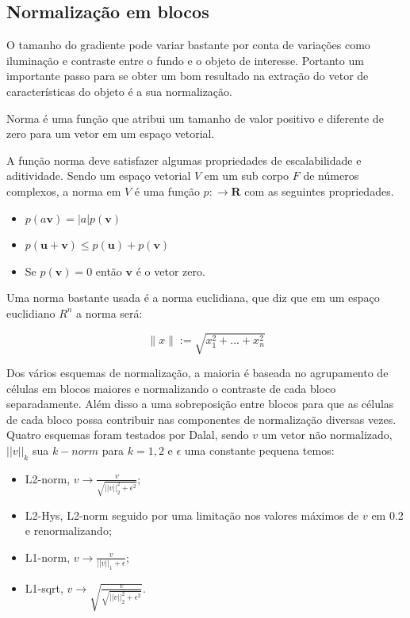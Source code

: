 \subsection{Normalização em blocos}

O tamanho do gradiente pode variar bastante por conta de variações como iluminação e contraste entre o fundo e o objeto de interesse. Portanto um importante passo para se obter um bom resultado na extração do vetor de características do objeto é a sua normalização.

Norma é uma função que atribui um tamanho de valor positivo e diferente de zero para um vetor em um espaço vetorial.

A função norma deve satisfazer algumas propriedades de escalabilidade e aditividade.
Sendo um espaço vetorial \(V\) em um sub corpo \(F\) de números complexos, a norma em \(V\) é uma função \(p:\rightarrow \mathbf{R}\) com as seguintes propriedades.

\begin{itemize}
\item \( p(a\mathbf{v}) = |a|p(\mathbf{v}) \)
\item \( p(\mathbf{u + v}) \leq p(\mathbf{u}) + p(\mathbf{v}) \)
\item Se \( p(\mathbf{v}) = 0 \) então \(\mathbf{v}\) é o vetor zero.
\end{itemize}

Uma norma bastante usada é a norma euclidiana,  que diz que em um espaço euclidiano \(R^n\) a norma será:

\[\|x\| := \sqrt{x_1^2 + ... + x_n^2}\]

Dos vários esquemas de normalização, a maioria é baseada no agrupamento de células em blocos maiores e normalizando o contraste de cada bloco separadamente. Além disso a uma sobreposição entre blocos para que as células de cada bloco possa contribuir nas componentes de normalização diversas vezes. Quatro esquemas foram testados por Dalal, sendo \(v\) um vetor não normalizado, \(||v||_k\) sua \(k-norm\) para \(k=1,2\) e \(\epsilon\) uma constante pequena temos:

\begin{itemize}
\item L2-norm, \(v \to \frac{v}{\sqrt{||v||_2^2 + \epsilon^2}}\);
\item L2-Hys, L2-norm seguido por uma limitação nos valores máximos de \(v\) em 0.2 e renormalizando; 
\item L1-norm, \(v \to \frac{v}{||v||_1 + \epsilon}\);
\item L1-sqrt, \(v \to \sqrt{\frac{v}{\sqrt{||v||_2^2 + \epsilon^2}}}\).
\end{itemize}

